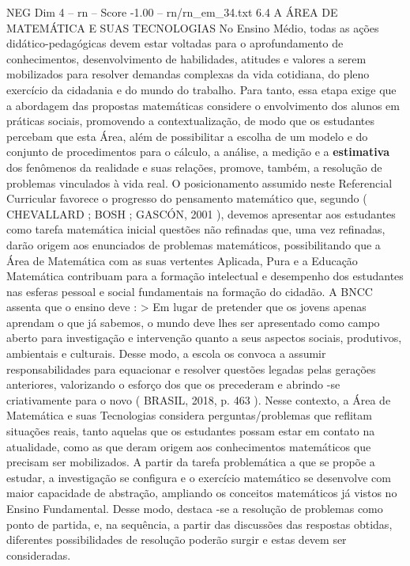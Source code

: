 \begin{textsample}{NEG Dim 4 – rn – Score -1.00 – rn/rn\_em\_34.txt}  \label{ex:f4_neg_209}
6.4 A ÁREA DE MATEMÁTICA E SUAS TECNOLOGIAS No Ensino Médio, todas as ações didático-pedagógicas devem estar voltadas para o aprofundamento de conhecimentos, desenvolvimento de habilidades, atitudes e valores a serem mobilizados para resolver demandas complexas da vida cotidiana, do pleno exercício da cidadania e do mundo do trabalho.
Para tanto, essa etapa exige que a abordagem das propostas matemáticas considere o envolvimento dos alunos em práticas sociais, promovendo a contextualização, de modo que os estudantes percebam que esta Área, além de possibilitar a escolha de um modelo e do conjunto de procedimentos para o cálculo, a análise, a medição e a \textbf{estimativa} dos fenômenos da realidade e suas relações, promove, também, a resolução de problemas vinculados à vida real.
O posicionamento assumido neste Referencial Curricular favorece o progresso do pensamento matemático que, segundo ( CHEVALLARD ; BOSH ; GASCÓN, 2001 ), devemos apresentar aos estudantes como tarefa matemática inicial questões não refinadas que, uma vez refinadas, darão origem aos enunciados de problemas matemáticos, possibilitando que a Área de Matemática com as suas vertentes Aplicada, Pura e a Educação Matemática contribuam para a formação intelectual e desempenho dos estudantes nas esferas pessoal e social fundamentais na formação do cidadão.
A BNCC assenta que o ensino deve : > Em lugar de pretender que os jovens apenas aprendam o que já sabemos, o mundo deve lhes ser apresentado como campo aberto para investigação e intervenção quanto a seus aspectos sociais, produtivos, ambientais e culturais.
Desse modo, a escola os convoca a assumir responsabilidades para equacionar e resolver questões legadas pelas gerações anteriores, valorizando o esforço dos que os precederam e abrindo -se criativamente para o novo ( BRASIL, 2018, p. 463 ).
Nesse contexto, a Área de Matemática e suas Tecnologias considera perguntas/problemas que reflitam situações reais, tanto aquelas que os estudantes possam estar em contato na atualidade, como as que deram origem aos conhecimentos matemáticos que precisam ser mobilizados.
A partir da tarefa problemática a que se propõe a estudar, a investigação se configura e o exercício matemático se desenvolve com maior capacidade de abstração, ampliando os conceitos matemáticos já vistos no Ensino Fundamental.
Desse modo, destaca -se a resolução de problemas como ponto de partida, e, na sequência, a partir das discussões das respostas obtidas, diferentes possibilidades de resolução poderão surgir e estas devem ser consideradas.

\end{textsample}

